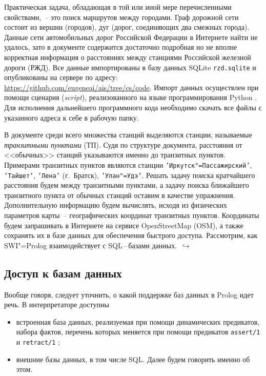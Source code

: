 \documentclass[a4paper,14pt, openany, twoside, draft]{extbook} %
\newcommand{\eeng}[1]{\emph{\foreignlanguage{english}{#1}}}
\newcommand{\nnn}[2][ncolor]{\noindent%
\textcolor{eclr}{!\ [}\textcolor{#1}{#2}\textcolor{eclr}{]}}
\newcommand{\goforth}[1]{$\,\hookrightarrow$\pageref{#1}}
\begin{document}

Практическая задача, обладающая в той или иной мере перечисленными свойствами,~-- это поиск маршрутов между городами.  Граф дорожной сети состоит из вершин (городов), дуг (дорог, соединяющих два смежных города).  Данные сети автомобильных дорог Российской Федерации в Интернете найти не удалось, зато в документе \cite{rzhddb} содержится достаточно подробная но не вполне корректная информация о расстояниях между станциями Российской железной дороги (РЖД).  Все данные импортированы в базу данных SQLite \cite{sqlite} \texttt{rzd.sqlite} и опубликованы на сервере по адресу: \url{https://github.com/eugeneai/ais/tree/cs/code}.  Импорт данных осуществлен при помощи сценария (\eeng{script}), реализованного на языке программирования Python \cite{pythondoc,pythondl,pythonbook}.  Для исполнения дальнейшего программного кода необходимо скачать все файлы с указанного адреса к себе в рабочую папку.

В документе \cite{rzhddb} среди всего множества станций выделяются станции, называемые \emph{транзитными пунктами} (ТП).  Судя по структуре документа, расстояния от <<обычных>> станций указываются именно до транзитных пунктов.  Примерами транзитных пунктов являются станции \texttt{'Иркутск"=Пассажирский'}, \texttt{'Тайшет'}, \texttt{'Лена'} (г.~Братск), \texttt{'Улан"=Удэ'}.  Решать задачу поиска кратчайшего расстояния будем между транзитными пунктами, а задачу поиска ближайшего транзитного пункта от обычных станций оставим в качестве упражнения.  Дополнительную информацию будем вычислять, исходя из физических параметров карты~-- географических координат транзитных пунктов.  Координаты будем запрашивать в Интернете на сервисе \foreignlanguage{english}{Open\-Street\-Map} (OSM), а также сохранять их в базе данных для обеспечения быстрого доступа.  Рассмотрим, как SWI"=Pro\-log взаимодействует с SQL\,--\,ба\-за\-ми данных. \goforth{par:informedcont}

\subsection{Доступ к базам данных}
\label{sec:dbms}

Вообще говоря, следует уточнить, о какой поддержке баз данных в Prolog идет речь.  В интерпретаторе доступны
\begin{itemize}
\item встроенная база данных, реализуемая при помощи динамических предикатов, набора фактов, перечень которых меняется при помощи предикатов \texttt{assert/1} и \texttt{retract/1} \cite{ais,Bratko};
\item внешние базы данных, в том числе SQL.  Далее будем говорить именно об этом.
\end{itemize}
\end{document}
